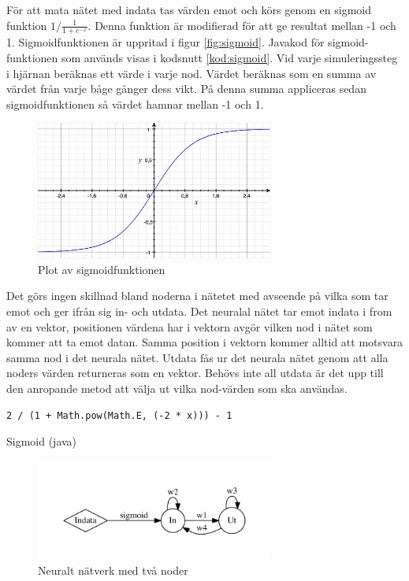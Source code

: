 \documentclass[titlepage, twocolumn, a4paper, 11pt, swedish]{article}
\begin{document}
För att mata nätet med indata tas värden emot och körs genom en sigmoid funktion $1/\frac{1}{1 + e^{-x}}$. Denna funktion är modifierad för att ge resultat mellan -1 och 1. Sigmoidfunktionen är uppritad i figur \vref{fig:sigmoid}. Javakod för sigmoid-funktionen som används visas i kodsnutt \vref{kod:sigmoid}. Vid varje simuleringssteg i hjärnan beräknas ett värde i varje nod. Värdet beräknas som en summa av värdet från varje båge gånger dess vikt. På denna summa appliceras sedan sigmoidfunktionen så värdet hamnar mellan -1 och 1.

\begin{figure}
    \includegraphics[width=78mm]{images/sigmoid.jpg}
    \caption{Plot av sigmoidfunktionen}
    \label{fig:sigmoid}
\end{figure}

Det görs ingen skillnad bland noderna i nätetet med avseende på vilka som tar emot och ger ifrån sig in- och utdata. Det neuralal nätet tar emot indata i from av en vektor, positionen värdena har i vektorn avgör vilken nod i nätet som kommer att ta emot datan. Samma position i vektorn kommer alltid att motsvara samma nod i det neurala nätet. Utdata fås ur det neurala nätet genom att alla noders värden returneras som en vektor. Behövs inte all utdata är det upp till den anropande metod att välja ut vilka nod-värden som ska användas.

\begin{kod}
\begin{footnotesize}
\begin{verbatim}
2 / (1 + Math.pow(Math.E, (-2 * x))) - 1
\end{verbatim}
\end{footnotesize}
\caption{Sigmoid (java)}\label{kod:sigmoid}
\end{kod}

\begin{figure}[H]
  \begin{center}
    \includegraphics[width=78mm]{images/neuralnet.pdf}
    \caption{Neuralt nätverk med två noder}
    \label{fig:neuralnet.pdf}
  \end{center}
\end{figure}
\end{document}
